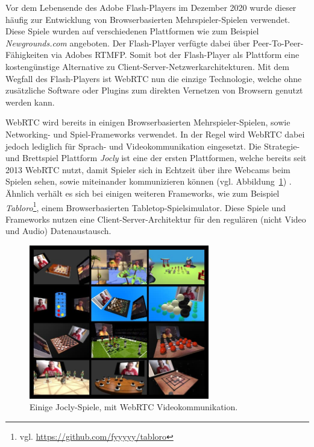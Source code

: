 Vor dem Lebensende des Adobe Flash-Players im Dezember 2020 wurde dieser häufig zur Entwicklung von Browserbasierten Mehrspieler-Spielen verwendet. Diese Spiele wurden auf verschiedenen Plattformen wie zum Beispiel \textit{Newgrounds.com} angeboten. Der Flash-Player verfügte dabei über Peer-To-Peer-Fähigkeiten via Adobes \acf{RTMFP}. Somit bot der Flash-Player als Plattform eine kostengünstige Alternative zu Client-Server-Netzwerkarchitekturen. Mit dem Wegfall des Flash-Players ist WebRTC nun die einzige Technologie, welche ohne zusätzliche Software oder Plugins zum direkten Vernetzen von Browsern genutzt werden kann.\par

\acs{WebRTC} wird bereits in einigen Browserbasierten Mehrspieler-Spielen, sowie Networking- und Spiel-Frameworks verwendet. In der Regel wird WebRTC dabei jedoch lediglich für Sprach- und Videokommunikation eingesetzt. Die Strategie- und Brettspiel Plattform \textit{Jocly} ist eine der ersten Plattformen, welche bereits seit 2013 \acs{WebRTC} nutzt, damit Spieler sich in Echtzeit über ihre Webcams beim Spielen sehen, sowie miteinander kommunizieren können (vgl. Abbildung~\ref{fig:jocly}) \cite{jocly2013}. Ähnlich verhält es sich bei einigen weiteren Frameworks, wie zum Beispiel \textit{Tabloro}\footnote{vgl. \url{https://github.com/fyyyyy/tabloro}}, einem Browserbasierten \glqq{}Tabletop\grqq{}-Spielsimulator. Diese Spiele und Frameworks nutzen eine Client-Server-Architektur für den regulären (nicht Video und Audio) Datenaustausch.

\begin{figure}[h]
\centering
\includegraphics[width=0.70\textwidth]{bilder/jocly-games.jpg}
\caption{Einige Jocly-Spiele, mit WebRTC Videokommunikation.}
\label{fig:jocly}
\end{figure}

